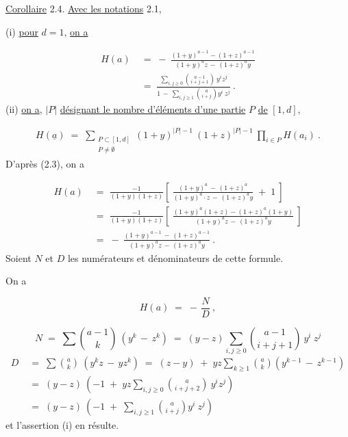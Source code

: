 
\underline{Corollaire} 2.4. \underline{Avec les notations} 2.1,

(i) \quad \underline{pour} $d = 1$, \underline{on a}

\begin{equation*}
\begin{aligned}
H(a) \;&=\; -\ \frac{(1+y)^{a-1} - (1+z)^{a-1}}{(1+y)^{a}z \,-\, (1+z)^{a}y}\\[2ex]
&=\; \frac{\displaystyle\sum_{i,j\geq 0}\binom{a-1}{i+j+1}\ y^{i}z^{j}}{1 \,-\, \displaystyle\sum_{i,j\geq 1}\binom{a}{i+j}y^{i}\ z^{j}}\ .
\end{aligned}
\end{equation*}
(ii) \quad \underline{on a}, $|P|$ \underline{désignant le nombre d'éléments d'une partie} $P$ \underline{de} $[1,d]$,

\begin{multline*}
H(\underline{a}) \;=\; \sum_{\substack{P \subset [1,d] \\ P \neq \emptyset}} (1+y)^{|P|-1}\ (1+z)^{|P|-1}\ \prod_{i \in P} H(a_{i})\ .
\end{multline*}
D'après (2.3), on a

\begin{equation*}
\begin{aligned}
H(a) \;&=\; \frac{-1}{(1+y)(1+z)}\left[\ \frac{(1+y)^{a} \,-\, (1+z)^{a}}{(1+y)^{a}\cdot z \,-\, (1+z)^{a}y} \;+\; 1\ \right]\\[2ex]
&=\; \frac{-1}{(1+y)(1+z)}\left[\ \frac{(1+y)^{a}(1+z)-(1+z)^{a}(1+y)}{(1+y)^{a}z \,-\, (1+z)^{a}y}\ \right]\\[2ex]
&=\; -\ \frac{(1+y)^{a-1} \,-\, (1+z)^{a-1}}{(1+y)^{a}z \,-\, (1+z)^{a}y}\ .
\end{aligned}
\end{equation*}
Soient $N$ et $D$ les numérateurs et dénominateurs de cette formule.

On a

\begin{equation*}
H(a) \;=\; -\,\frac{N}{D}\ , 
\end{equation*}


\begin{equation*}
 N \;=\; \sum \binom{a-1}{k}\ (y^{k} \,-\, z^{k}) \;=\; (y-z) \sum_{i,j\geq 0}\binom{a-1}{i+j+1}\ y^{i}\ z^{j}
\end{equation*}
\begin{equation*}
\begin{aligned}
D \;&=\; \sum \binom{a}{k}\ (y^{k}z \,-\, yz^{k}) \;=\; (z-y) \;+\; yz \sum_{k\geq 1}\binom{a}{k}\!\left(y^{k-1} \,-\, z^{k-1}\right)\\[2ex]
&=\; (y-z)\ (-1 \;+\; yz \sum_{i,j\geq 0}\binom{a}{i+j+2}\ y^{i}z^{j})\\[2ex]
&=\; (y-z)\ (-1 \;+\; \sum_{i,j\geq 1}\binom{a}{i+j}y^{i}\ z^{j})
\end{aligned}
\end{equation*}
et l'assertion (i) en résulte.

